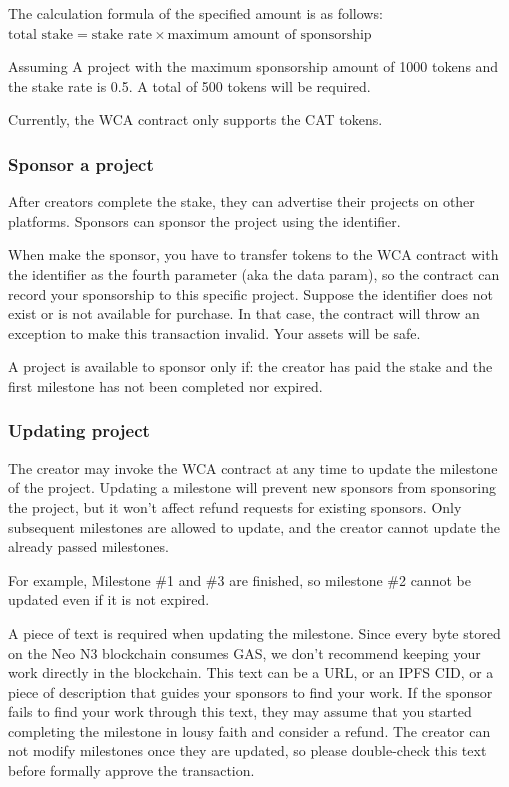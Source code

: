 \documentclass[12pt,a4paper]{article}
\begin{document}
    The calculation formula of the specified amount is as follows:
    $\text{total stake} = \text{stake rate} \times \text{maximum amount of sponsorship}$

    Assuming A project with the maximum sponsorship amount of 1000 tokens and
    the stake rate is 0.5. A total of 500 tokens will be required.

    Currently, the WCA contract only supports the CAT tokens.

    \subsubsection{Sponsor a project}

    After creators complete the stake, they can advertise their projects on other
    platforms.
    Sponsors can sponsor the project using the identifier.

    When make the sponsor, you have to transfer tokens to the WCA contract with
    the identifier as the fourth parameter (aka the data param), so the contract
    can record your sponsorship to this specific project.
    Suppose the identifier does not exist or is not available for purchase.
    In that case, the contract will throw an exception to make this transaction
    invalid.
    Your assets will be safe.

    A project is available to sponsor only if: the creator has paid the stake
    and the first milestone has not been completed nor expired.

    \subsubsection{Updating project}

    The creator may invoke the WCA contract at any time to update the milestone
    of the project.
    Updating a milestone will prevent new sponsors from sponsoring the project,
    but it won't affect refund requests for existing sponsors.
    Only subsequent milestones are allowed to update, and the creator cannot
    update the already passed milestones.

    For example, Milestone \#1 and \#3 are finished, so milestone \#2 cannot be
    updated even if it is not expired.

    A piece of text is required when updating the milestone.
    Since every byte stored on the Neo N3 blockchain consumes GAS, we don't
    recommend keeping your work directly in the blockchain.
    This text can be a URL, or an IPFS CID, or a piece of description that guides
    your sponsors to find your work.
    If the sponsor fails to find your work through this text, they may assume that
    you started completing the milestone in lousy faith and consider a refund.
    The creator can not modify milestones once they are updated, so please
    double-check this text before formally approve the transaction.
\end{document}
